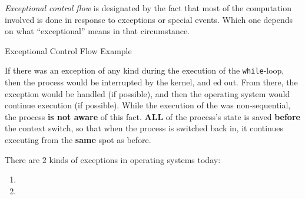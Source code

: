 \begin{definition}\label{def:Exceptional_Control_Flow}
  \emph{Exceptional control flow} is designated by the fact that most of the computation involved is done in response to exceptions or special events.
  Which one depends on what ``exceptional'' means in that circumstance.
\end{definition}

\begin{listing}[h!tbp]
\caption{Exceptional Control Flow Example}
\label{lst:Exceptional_Control_Flow}
\end{listing}

If there was an exception of any kind during the execution of the \texttt{while}-loop, then the process would be interrupted by the kernel, and ed out.
From there, the exception would be handled (if possible), and then the operating system would continue execution (if possible).
While the execution of the  was non-sequential, the process \textbf{is not aware} of this fact.
{\large\textbf{ALL}} of the process's state is saved \textbf{before} the context switch, so that when the process is switched back in, it continues executing from the \textbf{same} spot as before.

There are 2 kinds of exceptions in operating systems today:
\begin{enumerate}[noitemsep]
\item {}
\item {}
\end{enumerate}


